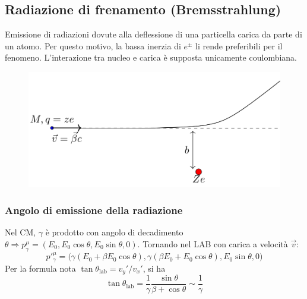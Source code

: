 \documentclass[10pt, a4paper]{scrartcl}
\numberwithin{equation}{subsection}
\theoremstyle{style1}
\begin{document}
\subsection{Radiazione di frenamento (Bremsstrahlung)}
Emissione di radiazioni dovute alla deflessione di una particella carica da parte di un atomo. Per questo motivo, la bassa inerzia di $e^{\pm} $ li rende preferibili per il fenomeno. L'interazione tra nucleo e carica \`e supposta unicamente coulombiana.
\begin{figure}[h!]
	\centering
	\includegraphics[width=.5\columnwidth]{b1.png}
\end{figure}
\subsubsection{Angolo di emissione della radiazione}
Nel CM, $\gamma$ \`e prodotto con angolo di decadimento $\theta \Rightarrow p^\mu _\gamma = (E_0, E_0 \cos \theta , E_0 \sin \theta ,0)$. Tornando nel LAB con carica a velocit\`a $\vec{v}$: 
\[
 p'^\mu _\gamma = \Big(\gamma(E_0 + \beta E_0\cos\theta ), \gamma (\beta  E_0 + E_0 \cos \theta ), E_0 \sin \theta,0 \Big)
\] 
Per la formula nota $\tan \theta _\text{lab}= v_y' / v_x ' $, si ha
\begin{equation}
	\tan \theta _\text{lab} = \frac{1}{\gamma} \frac{\sin \theta }{\beta  + \cos \theta } \sim \frac{1}{\gamma}
\end{equation}
\end{document}
